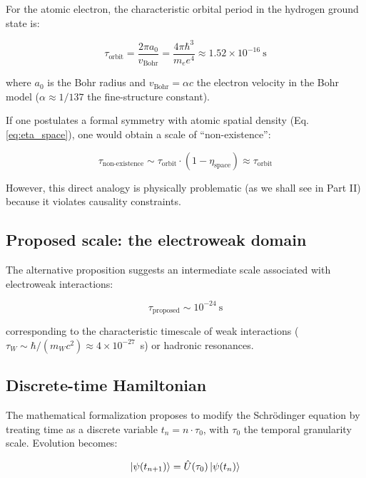 \documentclass[11pt,a4paper]{article}
\begin{document}
For the atomic electron, the characteristic orbital period in the hydrogen ground state is:

\begin{equation}\label{eq:orbital_period}
\tau_{\text{orbit}} = \frac{2\pi a_0}{v_{\text{Bohr}}} = \frac{4\pi \hbar^3}{m_e e^4} \approx 1.52 \times 10^{-16}~\text{s}
\end{equation}

where $a_0$ is the Bohr radius and $v_{\text{Bohr}} = \alpha c$ the electron velocity in the Bohr model ($\alpha \approx 1/137$ the fine-structure constant).

If one postulates a formal symmetry with atomic spatial density (Eq. \ref{eq:eta_space}), one would obtain a scale of ``non-existence'':

\begin{equation}\label{eq:naive_nonexistence}
\tau_{\text{non-existence}} \sim \tau_{\text{orbit}} \cdot (1-\eta_{\text{space}}) \approx \tau_{\text{orbit}}
\end{equation}

However, this direct analogy is physically problematic (as we shall see in Part II) because it violates causality constraints.

\subsection{Proposed scale: the electroweak domain}

The alternative proposition suggests an intermediate scale associated with electroweak interactions:

\begin{equation}\label{eq:proposed_scale}
\tau_{\text{proposed}} \sim 10^{-24}~\text{s}
\end{equation}

corresponding to the characteristic timescale of weak interactions ($\tau_W \sim \hbar/(m_W c^2) \approx 4 \times 10^{-27}$~s) or hadronic resonances.

\subsection{Discrete-time Hamiltonian}

The mathematical formalization proposes to modify the Schrödinger equation by treating time as a discrete variable $t_n = n \cdot \tau_0$, with $\tau_0$ the temporal granularity scale. Evolution becomes:

\begin{equation}\label{eq:discrete_evolution}
\ket{\psi(t_{n+1})} = \hat{U}(\tau_0)\ket{\psi(t_n)}
\end{equation}
\end{document}
